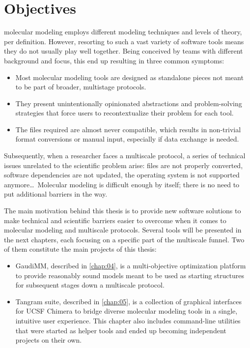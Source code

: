 \chapter{Objectives}
\label{chap:03}

 molecular modeling employs different modeling techniques and levels of theory, per definition. However, resorting to such a vast variety of software tools means they do not usually play well together. Being conceived by teams with different background and focus, this end up resulting in three common symptoms:

\begin{itemize}
	\item Most molecular modeling tools are designed as standalone pieces not meant to be part of broader, multistage protocols.

	\item They present unintentionally opinionated abstractions and problem-solving strategies that force users to recontextualize their problem for each tool.

	\item The files required are almost never compatible, which results in non-trivial format conversions or manual input, especially if data exchange is needed.
\end{itemize}

Subsequently, when a researcher faces a multiscale protocol, a series of technical issues unrelated to the scientific problem arise: files are not properly converted, software dependencies are not updated, the operating system is not supported anymore\ldots\ Molecular modeling is difficult enough by itself; there is no need to put additional barriers in the way.

The main motivation behind this thesis is to provide new software solutions to make technical and scientific barriers easier to overcome when it comes to molecular modeling and multiscale protocols. Several tools will be presented in the next chapters, each focusing on a specific part of the multiscale funnel. Two of them constitute the main projects of this thesis:

\begin{itemize}
	\item GaudiMM, described in \autoref{chap:04}, is a multi-objective optimization platform to provide reasonably sound models meant to be used as starting structures for subsequent stages down a multiscale protocol.

	\item Tangram suite, described in \autoref{chap:05}, is a collection of graphical interfaces for UCSF Chimera to bridge diverse molecular modeling tools in a single, intuitive user experience. This chapter also includes command-line utilities that were started as helper tools and ended up becoming independent projects on their own.
\end{itemize}

